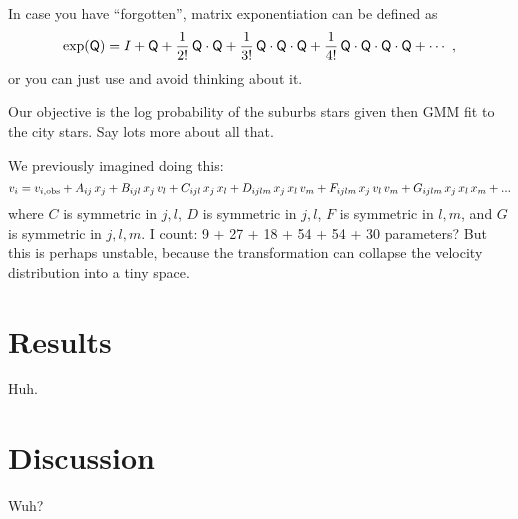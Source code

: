 \documentclass[modern]{aastex62}
\begin{document}
In case you have ``forgotten'', matrix exponentiation can be defined as
\begin{equation}
  \exp(\mat{Q}) = I + \mat{Q} + \frac{1}{2!}\,\mat{Q}\cdot\mat{Q}
  + \frac{1}{3!}\,\mat{Q}\cdot\mat{Q}\cdot\mat{Q}
  + \frac{1}{4!}\,\mat{Q}\cdot\mat{Q}\cdot\mat{Q}\cdot\mat{Q}
  + \cdots
  ~,
\end{equation}
or you can just use  and avoid thinking about it.

Our objective is the log probability of the suburbs stars given then
GMM fit to the city stars. Say lots more about all that.

We previously imagined doing this:
\begin{equation}
    v_i = v_{i, {\rm obs}} + A_{ij}\,x_j +
        B_{ijl}\,x_j\,v_l + C_{ijl}\,x_j\,x_l +
        D_{ijlm}\,x_j\,x_l\,v_m + F_{ijlm}\,x_j\,v_l\,v_m +
        G_{ijlm}\,x_j\,x_l\,x_m +
        ...
\end{equation}
where $C$ is symmetric in $j, l$, $D$ is symmetric in $j, l$, $F$ is symmetric
in $l, m$, and $G$ is symmetric in $j, l, m$.
I count: 9 + 27 + 18 + 54 + 54 + 30 parameters?
But this is perhaps unstable, because the transformation can collapse the
velocity distribution into a tiny space.


\section{Results}
\label{sec:results}

Huh.

\section{Discussion}
\label{sec:discussion}

Wuh?


\end{document}
